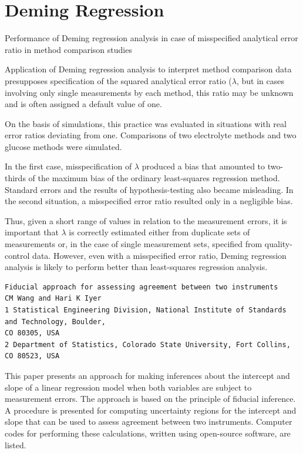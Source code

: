 \documentclass[MAIN.tex]{subfiles}
\begin{document}
\section*{Deming Regression}

Performance of Deming regression analysis in case of misspecified analytical error ratio in method comparison studies

Application of Deming regression analysis to interpret method comparison data presupposes specification of the 
squared analytical error ratio ($\lambda$, but in cases involving only single measurements by each method, this 
ratio may be unknown and is often assigned a default value of one. 

On the basis of simulations, this practice was evaluated in situations with real error ratios deviating from one. 
Comparisons of two electrolyte methods and two glucose methods were simulated. 

In the first case, misspecification of $\lambda$ produced a bias that amounted to two-thirds of the maximum bias of the 
ordinary least-squares regression method. Standard errors and the results of hypothesis-testing also became misleading. 
In the second situation, a misspecified error ratio resulted only in a negligible bias. 

Thus, given a short range of values in relation to the measurement errors, it is important that $\lambda$ is correctly 
estimated either from duplicate sets of measurements or, in the case of single measurement sets, specified from 
quality-control data. However, even with a misspecified error ratio, Deming regression analysis is likely to perform 
better than least-squares regression analysis.

\newpage
\begin{verbatim}
Fiducial approach for assessing agreement between two instruments
CM Wang and Hari K Iyer
1 Statistical Engineering Division, National Institute of Standards and Technology, Boulder,
CO 80305, USA
2 Department of Statistics, Colorado State University, Fort Collins, CO 80523, USA

\end{verbatim}

This paper presents an approach for making inferences about the intercept and slope of a linear
regression model when both variables are subject to measurement errors. The approach is
based on the principle of fiducial inference. A procedure is presented for computing
uncertainty regions for the intercept and slope that can be used to assess agreement between
two instruments. Computer codes for performing these calculations, written using open-source
software, are listed.
\end{document}

